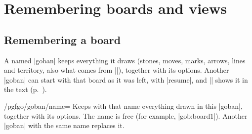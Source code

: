 \section{Remembering boards and views}
\label{sec:memoria}

	\subsection{Remembering a board}
	\label{subsec:recordar}
	A named |goban| keeps everything it draws (stones, moves, marks, arrows, lines and territory, also what comes from |\sgf|), together with its options. Another |goban| can start with that board as it was left, with |resume|, and |\pgfgoview| shows it in the text (p.~\pageref{subsec:vistas}).

	\begin{codeexample}[]

		\begin{goban}[name = board1]
		\end{goban}

		\begin{goban}[resume = board1]
		\end{goban}

		\begin{goban}[resume = {board1, numbers}]
		\end{goban}
	\end{codeexample}

	\begin{key}{/pgfgo/goban/name=}
		Keeps with that name everything drawn in this |goban|, together with its options. The name is free (for example, |gob:board1|). Another |goban| with the same name replaces it.
	\end{key}

